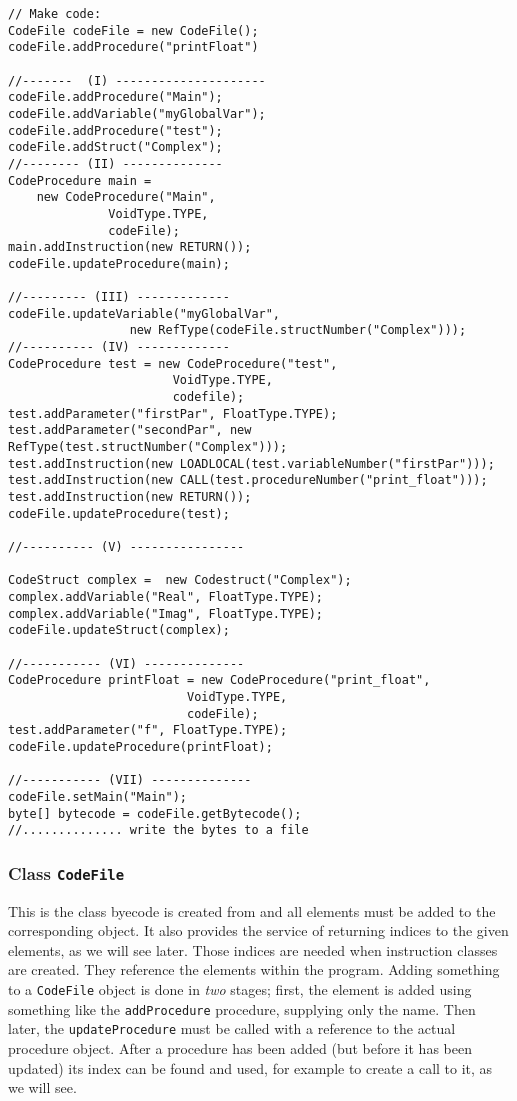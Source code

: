 \documentclass[11pt]{article}
\begin{document}
\begin{lstlisting}
// Make code:
CodeFile codeFile = new CodeFile();
codeFile.addProcedure("printFloat")

//-------  (I) ---------------------
codeFile.addProcedure("Main");
codeFile.addVariable("myGlobalVar");
codeFile.addProcedure("test");
codeFile.addStruct("Complex");
//-------- (II) --------------
CodeProcedure main = 
    new CodeProcedure("Main", 
		      VoidType.TYPE, 	     
		      codeFile);
main.addInstruction(new RETURN());
codeFile.updateProcedure(main);

//--------- (III) -------------
codeFile.updateVariable("myGlobalVar",
		         new RefType(codeFile.structNumber("Complex")));
//---------- (IV) -------------
CodeProcedure test = new CodeProcedure("test",
				       VoidType.TYPE,
				       codefile);
test.addParameter("firstPar", FloatType.TYPE);
test.addParameter("secondPar", new RefType(test.structNumber("Complex")));
test.addInstruction(new LOADLOCAL(test.variableNumber("firstPar")));
test.addInstruction(new CALL(test.procedureNumber("print_float")));
test.addInstruction(new RETURN());
codeFile.updateProcedure(test);

//---------- (V) ----------------

CodeStruct complex =  new Codestruct("Complex");
complex.addVariable("Real", FloatType.TYPE);
complex.addVariable("Imag", FloatType.TYPE);
codeFile.updateStruct(complex);

//----------- (VI) --------------
CodeProcedure printFloat = new CodeProcedure("print_float",
					     VoidType.TYPE, 
					     codeFile);
test.addParameter("f", FloatType.TYPE);
codeFile.updateProcedure(printFloat);

//----------- (VII) --------------
codeFile.setMain("Main");
byte[] bytecode = codeFile.getBytecode();
//.............. write the bytes to a file
\end{lstlisting}


\subsubsection{Class \texttt{CodeFile}}
\label{sec:org6a74ac8}



This is the class byecode is created from and all elements must be added to
the corresponding object. It also provides the service of returning indices
to the given elements, as we will see later. Those indices are needed when
instruction classes are created. They reference the elements within the
program. Adding something to a \texttt{CodeFile} object is done in \emph{two} stages;
first, the element is added using something like the \texttt{addProcedure}
procedure, supplying only the name. Then later, the \texttt{updateProcedure} must
be called with a reference to the actual procedure object. After a
procedure has been added (but before it has been updated) its index can be
found and used, for example to create a call to it, as we will see.
\end{document}

